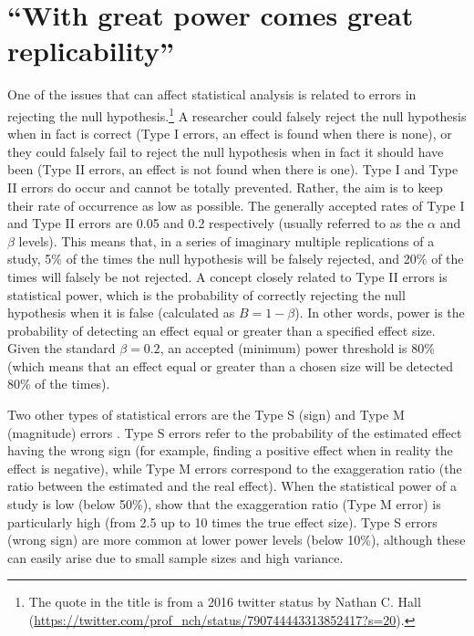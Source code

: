 \documentclass[12pt,a4paper,]{article}
\begin{document}
\hypertarget{with-great-power-comes-great-replicability}{%
\section{``With great power comes great
replicability''}\label{with-great-power-comes-great-replicability}}

One of the issues that can affect statistical analysis is related to
errors in rejecting the null
hypothesis.\footnote{The quote in the title is from a 2016 twitter status by Nathan C. Hall (\url{https://twitter.com/prof_nch/status/790744443313852417?s=20}).}
A researcher could falsely reject the null hypothesis when in fact is
correct (Type I errors, an effect is found when there is none), or they
could falsely fail to reject the null hypothesis when in fact it should
have been (Type II errors, an effect is not found when there is one).
Type I and Type II errors do occur and cannot be totally prevented.
Rather, the aim is to keep their rate of occurrence as low as possible.
The generally accepted rates of Type I and Type II errors are 0.05 and
0.2 respectively (usually referred to as the \(\alpha\) and \(\beta\)
levels). This means that, in a series of imaginary multiple replications
of a study, 5\% of the times the null hypothesis will be falsely
rejected, and 20\% of the times will falsely be not rejected. A concept
closely related to Type II errors is statistical power, which is the
probability of correctly rejecting the null hypothesis when it is false
(calculated as \(B = 1 - \beta\)). In other words, power is the
probability of detecting an effect equal or greater than a specified
effect size. Given the standard \(\beta = 0.2\), an accepted (minimum)
power threshold is 80\% (which means that an effect equal or greater
than a chosen size will be detected 80\% of the times).

Two other types of statistical errors are the Type S (sign) and Type M
(magnitude) errors \citep{gelman2000, gelman2014}. Type S errors refer
to the probability of the estimated effect having the wrong sign (for
example, finding a positive effect when in reality the effect is
negative), while Type M errors correspond to the exaggeration ratio (the
ratio between the estimated and the real effect). When the statistical
power of a study is low (below 50\%), \citet{gelman2014} show that the
exaggeration ratio (Type M error) is particularly high (from 2.5 up to
10 times the true effect size). Type S errors (wrong sign) are more
common at lower power levels (below 10\%), although these can easily
arise due to small sample sizes and high variance.
\end{document}
